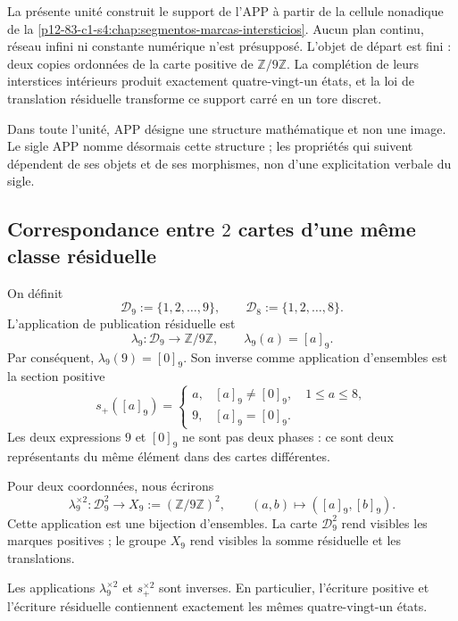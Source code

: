 La présente unité construit le support de l’APP à partir de la cellule
nonadique de la \cref{p12-83-c1-s4:chap:segmentos-marcas-intersticios}. Aucun
plan continu, réseau infini ni constante numérique n’est présupposé. L’objet de
départ est fini : deux copies ordonnées de la carte positive de
\(\mathbb Z/9\mathbb Z\). La complétion de leurs interstices intérieurs
produit exactement quatre-vingt-un états, et la loi de translation résiduelle
transforme ce support carré en un tore discret.

Dans toute l’unité, APP désigne une structure mathématique et non une image.
Le sigle APP nomme désormais cette structure ; les propriétés qui
suivent dépendent de ses objets et de ses morphismes, non d’une explicitation verbale du
sigle.

\subsection{Correspondance entre \(2\) cartes d’une même classe résiduelle}

On définit
\[
 \mathcal D_9:=\{1,2,\ldots,9\},
 \qquad
 \mathcal D_8:=\{1,2,\ldots,8\}.
\]
L’application de publication résiduelle est
\[
 \lambda_9:\mathcal D_9\longrightarrow\mathbb Z/9\mathbb Z,
 \qquad
 \lambda_9(a)=[a]_9.
\]
Par conséquent, \(\lambda_9(9)=[0]_9\). Son inverse comme application
d’ensembles est la section positive
\[
 s_+([a]_9)=
 \begin{cases}
  a,&[a]_9\neq[0]_9,\quad 1\leq a\leq8,\\
  9,&[a]_9=[0]_9.
 \end{cases}
\]
Les deux expressions \(9\) et \([0]_9\) ne sont pas deux phases : ce sont deux
représentants du même élément dans des cartes différentes.

Pour deux coordonnées, nous écrirons
\[
 \lambda_9^{\times2}:\mathcal D_9^2
       \longrightarrow X_9:=(\mathbb Z/9\mathbb Z)^2,
 \qquad
 (a,b)\longmapsto([a]_9,[b]_9).
\]
Cette application est une bijection d’ensembles. La carte
\(\mathcal D_9^2\) rend visibles les marques positives ; le groupe \(X_9\)
rend visibles la somme résiduelle et les translations.

\begin{lemma}
\label{p12-83-c1-s2:lem:app-cambio-carta-sin-perdida}
Les applications \(\lambda_9^{\times2}\) et
\(s_+^{\times2}\) sont inverses. En particulier, l’écriture positive et
l’écriture résiduelle contiennent exactement les mêmes quatre-vingt-un états.
\end{lemma}

